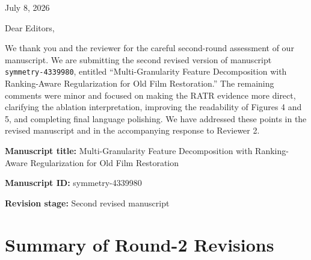 \documentclass[11pt]{article}
\begin{document}
\begin{flushright}
July 8, 2026
\end{flushright}

Dear Editors,

We thank you and the reviewer for the careful second-round assessment of our manuscript. We are submitting the second revised version of manuscript \texttt{symmetry-4339980}, entitled ``Multi-Granularity Feature Decomposition with Ranking-Aware Regularization for Old Film Restoration.'' The remaining comments were minor and focused on making the RATR evidence more direct, clarifying the ablation interpretation, improving the readability of Figures 4 and 5, and completing final language polishing. We have addressed these points in the revised manuscript and in the accompanying response to Reviewer 2.

\textbf{Manuscript title:} Multi-Granularity Feature Decomposition with Ranking-Aware Regularization for Old Film Restoration

\textbf{Manuscript ID:} symmetry-4339980

\textbf{Revision stage:} Second revised manuscript

\section*{Summary of Round-2 Revisions}
\end{document}

